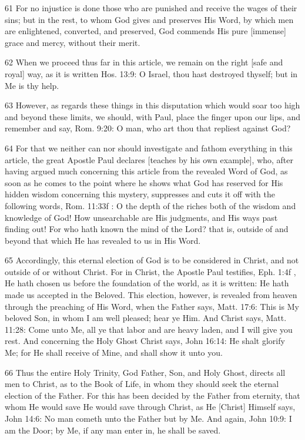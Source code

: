 {61 For no injustice is done those who are punished and receive the wages of their sins; but in the rest, to whom God gives and preserves His Word, by which men are enlightened, converted, and preserved, God commends His pure [immense] grace and mercy, without their merit.

62 When we proceed thus far in this article, we remain on the right [safe and royal] way, as it is written Hos. 13:9: O Israel, thou hast destroyed thyself; but in Me is thy help.

63 However, as regards these things in this disputation which would soar too high and beyond these limits, we should, with Paul, place the finger upon our lips, and remember and say, Rom. 9:20: O man, who art thou that repliest against God?

64 For that we neither can nor should investigate and fathom everything in this article, the great Apostle Paul declares [teaches by his own example], who, after having argued much concerning this article from the revealed Word of God, as soon as he comes to the point where he shows what God has reserved for His hidden wisdom concerning this mystery, suppresses and cuts it off with the following words, Rom. 11:33f : O the depth of the riches both of the wisdom and knowledge of God! How unsearchable are His judgments, and His ways past finding out! For who hath known the mind of the Lord? that is, outside of and beyond that which He has revealed to us in His Word.

65 Accordingly, this eternal election of God is to be considered in Christ, and not outside of or without Christ. For in Christ, the Apostle Paul testifies, Eph. 1:4f , He hath chosen us before the foundation of the world, as it is written: He hath made us accepted in the Beloved. This election, however, is revealed from heaven through the preaching of His Word, when the Father says, Matt. 17:6: This is My beloved Son, in whom I am well pleased; hear ye Him. And Christ says, Matt. 11:28: Come unto Me, all ye that labor and are heavy laden, and I will give you rest. And concerning the Holy Ghost Christ says, John 16:14: He shalt glorify Me; for He shall receive of Mine, and shall show it unto you.

66 Thus the entire Holy Trinity, God Father, Son, and Holy Ghost, directs all men to Christ, as to the Book of Life, in whom they should seek the eternal election of the Father. For this has been decided by the Father from eternity, that whom He would save He would save through Christ, as He [Christ] Himself says, John 14:6: No man cometh unto the Father but by Me. And again, John 10:9: I am the Door; by Me, if any man enter in, he shall be saved.

}
